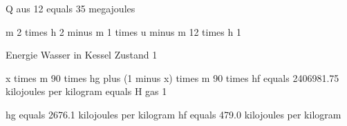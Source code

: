 Q aus 12 equals 35 megajoules

m 2 times h 2 minus m 1 times u minus m 12 times h 1

Energie Wasser in Kessel Zustand 1

x times m 90 times hg plus (1 minus x) times m 90 times hf equals 2406981.75 kilojoules per kilogram equals H gas 1

hg equals 2676.1 kilojoules per kilogram
hf equals 479.0 kilojoules per kilogram